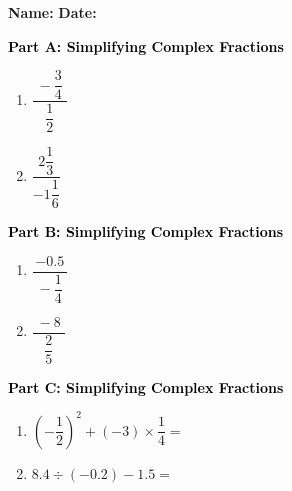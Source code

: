 \documentclass[12pt, letterpaper, fleqn]{article}
\begin{document}
\textbf{Name:} \underline{\hspace{5cm}}
\hfill
\textbf{Date:} \underline{\hspace{3cm}}\\

\begin{tcolorbox}[colback=customteal!20]
\large\textcolor{black}{\textbf{Part A: Simplifying Complex Fractions}}
\end{tcolorbox}

\vspace{3mm}

\begin{enumerate}[itemsep=2.5cm, leftmargin=0.6cm]
\item $\dfrac{\;-\dfrac{3}{4}\;}{\dfrac{1}{2}}$
\item $\dfrac{\;2\dfrac{1}{3}\;}{-1\dfrac{1}{6}}$
\end{enumerate}

\newpage

\begin{tcolorbox}[colback=customteal!20]
\large\textcolor{black}{\textbf{Part B: Simplifying Complex Fractions}}
\end{tcolorbox}

\vspace{3mm}

\begin{enumerate}[itemsep=2.5cm, leftmargin=0.6cm, resume]
\item $\dfrac{-0.5}{\;-\dfrac{1}{4}\;}$
\item $\dfrac{\;-8\;}{\dfrac{2}{5}}$
\end{enumerate}

\newpage

\begin{tcolorbox}[colback=customteal!20]
\large\textcolor{black}{\textbf{Part C: Simplifying Complex Fractions}}
\end{tcolorbox}

\vspace{3mm}

\begin{enumerate}[itemsep=2.5cm, leftmargin=0.6cm, resume]
\item $\left(-\dfrac{1}{2}\right)^2 + \left(-3\right) \times \dfrac{1}{4} =$
\item $8.4 \div (-0.2) - 1.5 =$
\end{enumerate}
\end{document}
